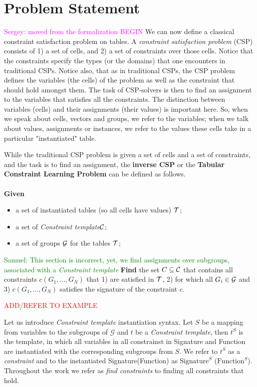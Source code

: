 \documentclass{ecai}
\newcommand{\sergey}[1]{\textcolor{magenta}{{\sc Sergey:} #1}\xspace}
\newcommand{\samuel}[1]{\textcolor{green}{{\sc Samuel:} #1}\xspace}
\newcommand{\format}[1]{\textit{#1}\xspace}
\newcommand{\template}{\format{Constraint template}}
\newcommand{\CSignature}{Signature\xspace}
\newcommand{\CFunction}{Function\xspace}
\newcommand{\groups}{\ensuremath{\mathcal{G}}\xspace}
\newcommand{\luc}[1]{{\textcolor{red}{#1}}}
\begin{document}
\section{Problem Statement}
\sergey{moved from the formalization BEGIN}
We can now define a classical constraint satisfaction problem on tables.
A {\em constraint satisfaction problem} (CSP)  consists of 1) a set of cells, and 2) a set of constraints over those cells.
Notice that the constraints specify the types (or the domains) that one encounters in traditional CSPs.
Notice also, that as in traditional CSPs, the CSP problem defines the variables (the cells) of the problem as well as the constraint that should hold amongst them. The task of CSP-solvers is then to find an assignment to the variables that satisfies all the constraints.
The distinction between variables (cells) and their assignments (their values) is important here.
So, when we speak about cells, vectors and groups, we refer to the variables; when we talk about values, assignments or instances, we refer to the values these cells take in a particular "instantiated" table.

While the traditional CSP problem is given a set of cells and a set of constraints,
and the task is to find an assignment, the {\bf inverse CSP} or the {\bf Tabular Constraint Learning Problem} can be defined as follows.\\
\\
{\bf Given }
\begin{itemize}
\item
a set of instantiated tables (so all cells have values) ${\cal T}$;
\item
a set of \template ${\cal C}$;
\item
a set of groups ${\cal G}$ for the tables ${\cal T}$;
\end{itemize}
\noindent
\samuel{This section is incorrect, yet, we find assignments over subgroups, associated with a \template}
{\bf Find}  the set $C\subseteq {\cal C}$ that contains all constraints $c(G_1, ... , G_N)$ that 1) are satisfied  in ${\cal T}$, 2)
for which
all $G_i \in {\cal G}$ and  3)  $c(G_1, ... , G_N)$ satisfies the signature of the constraint $c$.


\luc{ADD/REFER TO EXAMPLE}

Let us introduce \template instantiation syntax. Let $S$ be a mapping from variables to the subgroups of \groups and $t$ be a \template, then $t^S$ is the template, in which all variables in all constrainst in \CSignature and \CFunction are instantiated with the corresponding subgroups from $S$. We refer to $t^S$ as a \textit{constraint} and to the instantiated \CSignature (\CFunction) as $\text{\CSignature}^S$ ($\text{\CFunction}^S$). Throughout the work we refer as \textit{find constraints} to finding all constraints that hold.
\end{document}
